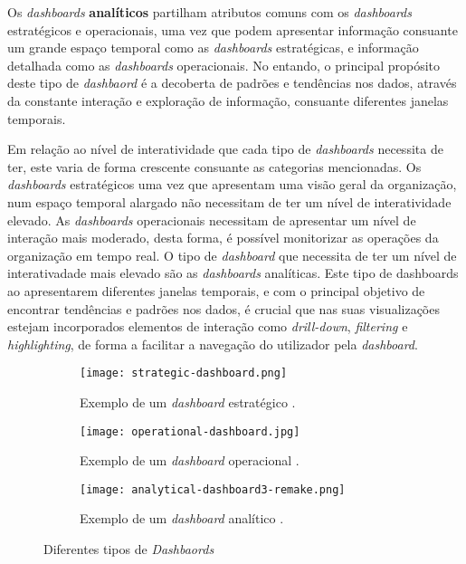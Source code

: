 Os \textit{dashboards} \textbf{analíticos} partilham atributos comuns com os \textit{dashboards} estratégicos e operacionais, uma vez que podem apresentar informação consuante um grande espaço temporal como as \textit{dashboards} estratégicas, e informação detalhada como as \textit{dashboards} operacionais. No entando, o principal propósito deste tipo de \textit{dashbaord} é a decoberta de padrões e tendências nos dados, através da constante interação e exploração de informação, consuante diferentes janelas temporais.

Em relação ao nível de interatividade que cada tipo de \textit{dashboards} necessita de ter, este varia de forma crescente consuante as categorias mencionadas. Os \textit{dashboards} estratégicos uma vez que apresentam uma visão geral da organização, num espaço temporal alargado não necessitam de ter um nível de interatividade elevado. As \textit{dashboards} operacionais necessitam de apresentar um nível de interação mais moderado, desta forma, é possível monitorizar as operações da organização em tempo real. O tipo de \textit{dashboard} que necessita de ter um nível de interativadade mais elevado são as \textit{dashboards} analíticas. Este tipo de dashboards ao apresentarem diferentes janelas temporais, e com o principal objetivo de encontrar tendências e padrões nos dados, é crucial que nas suas visualizações estejam incorporados elementos de interação como \textit{drill-down}, \textit{filtering} e \textit{highlighting}, de forma a facilitar a navegação do utilizador pela \textit{dashboard}.

\begin{figure}[htbp]
  \begin{subfigure}{0.5\textwidth}
    \texttt{[image: strategic-dashboard.png]} 
    \caption{Exemplo de um \textit{dashboard} estratégico \cite{IntrafocusKPIDashboard}.}
    \label{fig:strat-dash}
  \end{subfigure}
  \begin{subfigure}{0.5\textwidth}
    \texttt{[image: operational-dashboard.jpg]}
    \caption{Exemplo de um \textit{dashboard} operacional \cite{RegendusPowerBIAlternatives}.}
    \label{fig:op-dash}
  \end{subfigure}
  \begin{subfigure}{0.5\textwidth}
    \texttt{[image: analytical-dashboard3-remake.png]}
    \caption{Exemplo de um \textit{dashboard} analítico \cite{QlikAnalyticsDashboard}.}
    \label{fig:anal-dash}
  \end{subfigure}
  
  \caption{Diferentes tipos de \textit{Dashbaords}}
  \label{fig:image2}
\end{figure}

